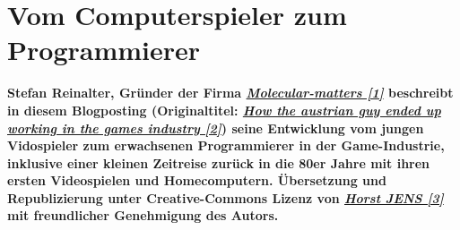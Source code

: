 \section*{Vom Computerspieler zum Programmierer} 
\label{austrianguy}

\textbf{Stefan Reinalter, Gründer der Firma \href{http://www.molecular-matters.com/}{\textit{Molecular-matters [1]}} beschreibt in diesem Blogposting (Originaltitel: \href{http://www.altdevblogaday.com/2011/09/27/how-the-austrian-guy-ended-up-working-in-the-games-industry/}{\textit{How the austrian guy ended up working in the games industry [2]}}) seine Entwicklung vom jungen Vidospieler zum erwachsenen Programmierer in der Game-Industrie, inklusive einer kleinen Zeitreise zurück in die 80er Jahre mit ihren ersten Videospielen und Homecomputern. Übersetzung und Republizierung unter Creative-Commons Lizenz von \href{http://spielend-programmieren.at}{\textit{Horst JENS [3]}} mit freundlicher Genehmigung des Autors.}
